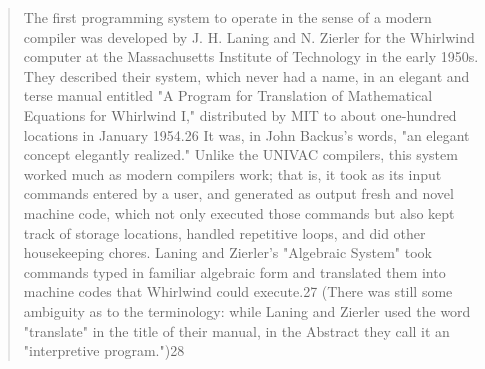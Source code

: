 \begin{quotation}
The first programming system to operate in the sense of a modern compiler was 
developed by J. H. Laning and N. Zierler for the Whirlwind computer at the 
Massachusetts Institute of Technology in the early 1950s. They described their 
system, which never had a name, in an elegant and terse manual entitled "A 
Program for Translation of Mathematical Equations for Whirlwind I," distributed 
by MIT to about one-hundred locations in January 1954.26 It was, in John 
Backus's words, "an elegant concept elegantly realized." Unlike the UNIVAC 
compilers, this system worked much as modern compilers work; that is, it took 
as its input commands entered by a user, and generated as output fresh and 
novel machine code, which not only executed those commands but also kept track 
of storage locations, handled repetitive loops, and did other housekeeping 
chores. Laning and Zierler's "Algebraic System" took commands typed in familiar 
algebraic form and translated them into machine codes that Whirlwind could 
execute.27 (There was still some ambiguity as to the terminology: while Laning 
and Zierler used the word "translate" in the title of their manual, in the 
Abstract they call it an "interpretive program.")28
\cite{new_history_of_modern_computing}
\end{quotation}


